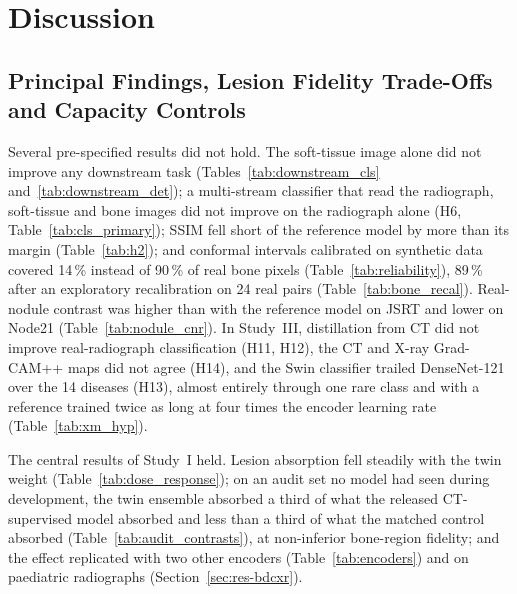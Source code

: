 \section{Discussion}
\label{sec:discussion}

\subsection{Principal Findings, Lesion Fidelity Trade-Offs and Capacity Controls}
\label{sec:d-principal}
Several pre-specified results did not hold. The soft-tissue image alone did not improve any downstream task
(Tables~\ref{tab:downstream_cls} and~\ref{tab:downstream_det}); a multi-stream classifier that read the radiograph, soft-tissue and bone
images did not improve on the radiograph alone (H6, Table~\ref{tab:cls_primary}); SSIM fell short of the reference model by more than its
margin (Table~\ref{tab:h2}); and conformal intervals calibrated on synthetic data covered 14\,\% instead of 90\,\% of real bone pixels
(Table~\ref{tab:reliability}), 89\,\% after an exploratory recalibration on 24 real pairs (Table~\ref{tab:bone_recal}). Real-nodule contrast
was higher than with the reference model on JSRT and lower on Node21 (Table~\ref{tab:nodule_cnr}). In Study~III, distillation from CT did
not improve real-radiograph classification (H11, H12), the CT and X-ray Grad-CAM++ maps did not agree (H14), and the Swin classifier trailed
DenseNet-121 over the 14 diseases (H13), almost entirely through one rare class and with a reference trained twice as long at four times the
encoder learning rate (Table~\ref{tab:xm_hyp}).

The central results of Study~I held. Lesion absorption fell steadily with the twin weight (Table~\ref{tab:dose_response}); on an audit set
no model had seen during development, the twin ensemble absorbed a third of what the released CT-supervised model absorbed and less than a
third of what the matched control absorbed (Table~\ref{tab:audit_contrasts}), at non-inferior bone-region fidelity; and the effect
replicated with two other encoders (Table~\ref{tab:encoders}) and on paediatric radiographs (Section~\ref{sec:res-bdcxr}).

